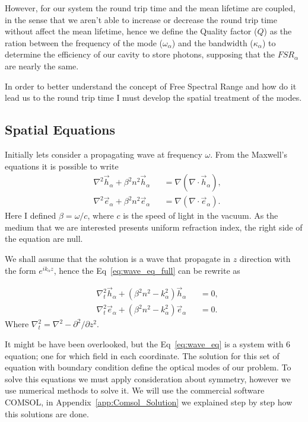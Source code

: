 However, for our system the round trip time and the mean lifetime are coupled, in the sense that we aren't able to increase or decrease the round trip time without affect the mean lifetime, hence we define the Quality factor ($Q$) as the ration between the frequency of the mode ($\omega_\alpha$) and the bandwidth ($\kappa_\alpha$) to determine the efficiency of our cavity to store photons, supposing that the $FSR_\alpha$ are nearly the same. 

In order to better understand the concept of Free Spectral Range and how do it lead us to the round trip time I must develop the spatial treatment of the modes. 
\subsection{Spatial Equations}

Initially lets consider a propagating wave at frequency $\omega$. From the Maxwell's equations it is possible to write
\begin{subequations}
    \begin{alignat}{2}
    &\nabla^2\vec{h}_\alpha+\beta^2n^2\vec{h}_\alpha &&= \nabla(\nabla\cdot\vec{h}_\alpha),\\
    &\nabla^2\vec{e}_\alpha+\beta^2n^2\vec{e}_\alpha &&= \nabla(\nabla\cdot\vec{e}_\alpha).
    \end{alignat}
    \label{eq:wave_eq_full}
\end{subequations}
Here I defined $\beta = \omega/c$, where $c$ is the speed of light in the vacuum. As the medium that we are interested presents uniform refraction index, the right side of the equation are null. 

We shall assume that the solution is a wave that propagate in $z$ direction with the form $e^{ik_\alpha z}$, hence the Eq~\ref{eq:wave_eq_full} can be rewrite as 

\begin{subequations}
    \begin{alignat}{2}
    &\nabla_t^2\vec{h}_\alpha+(\beta^2n^2-k_\alpha^2)\vec{h}_\alpha &&=0,\\
    &\nabla_t^2\vec{e}_\alpha+(\beta^2n^2-k_\alpha^2)\vec{e}_\alpha &&=0.
    \end{alignat}
    \label{eq:wave_eq}
\end{subequations}
Where $\nabla_t^2 = \nabla^2 - \partial^2/\partial z^2$.

It might be have been overlooked, but the Eq~\ref{eq:wave_eq} is a system with 6 equation; one for which field in each coordinate. The solution for this set of equation with boundary condition define the optical modes of our problem. To solve this equations we must apply consideration about symmetry, however we use numerical methods to solve it. We will use the commercial software COMSOL\regmark, in Appendix~\ref{app:Comsol_Solution} we explained step by step how this solutions are done. 


